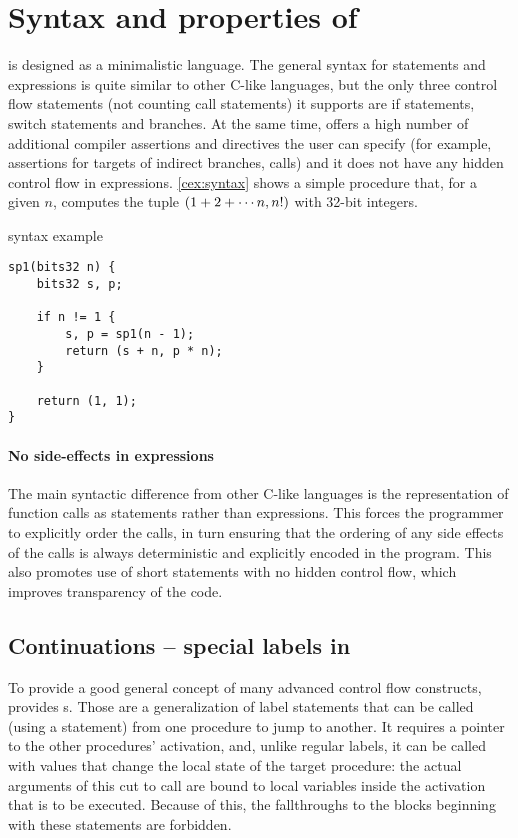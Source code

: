 \section{Syntax and properties of \cmm}

\cmm is designed as a minimalistic language. The general syntax for statements and expressions is quite similar to other C-like languages, but the only three control flow statements (not counting call statements) it supports are if statements, switch statements and branches. At the same time, \cmm offers a high number of additional compiler assertions and directives the user can specify (for example, assertions for targets of indirect branches, calls) and it does not have any hidden control flow in expressions. \cref{cex:syntax} shows a simple procedure  that, for a given $n$, computes the tuple $\left(1 + 2 + \cdots n, n!\right)$ with 32-bit integers.

\begin{codex}
    \caption{\cmm syntax example}
    \label{cex:syntax}

    \begin{lstlisting}
sp1(bits32 n) {
    bits32 s, p;

    if n != 1 {
        s, p = sp1(n - 1);
        return (s + n, p * n);
    }

    return (1, 1);
}
    \end{lstlisting}
\end{codex}

\paragraph{No side-effects in expressions}

The main syntactic difference from other C-like languages is the representation of function calls as statements rather than expressions. This forces the programmer to explicitly order the calls, in turn ensuring that the ordering of any side effects of the calls is always deterministic and explicitly encoded in the program. This also promotes use of short statements with no hidden control flow, which improves transparency of the code.

\subsection{Continuations -- special labels in \cmm}

To provide a good general concept of many advanced control flow constructs, \cmm provides s. Those are a generalization of label statements that can be called (using a  statement) from one procedure to jump to another. It requires a pointer to the other procedures' activation, and, unlike regular labels, it can be called with values that change the local state of the target procedure: the actual arguments of this cut to call are bound to local variables inside the activation that is to be executed. Because of this, the fallthroughs to the blocks beginning with these statements are forbidden.

